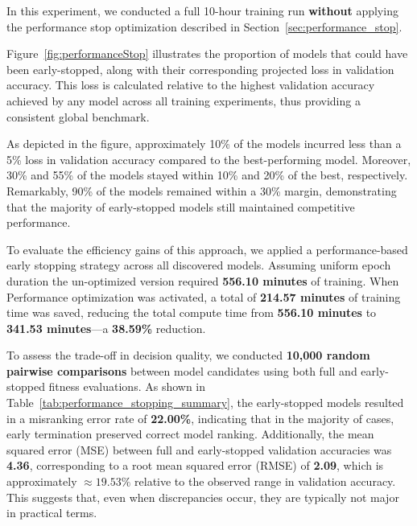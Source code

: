 In this experiment, we conducted a full 10-hour training run \textbf{without} applying the performance stop optimization described in Section~\ref{sec:performance_stop}.

Figure~\ref{fig:performanceStop} illustrates the proportion of models that could have been early-stopped, along with their corresponding projected loss in validation accuracy. This loss is calculated relative to the highest validation accuracy achieved by any model across all training experiments, thus providing a consistent global benchmark.

As depicted in the figure, approximately 10\% of the models incurred less than a 5\% loss in validation accuracy compared to the best-performing model. Moreover, 30\% and 55\% of the models stayed within 10\% and 20\% of the best, respectively. Remarkably, 90\% of the models remained within a 30\% margin, demonstrating that the majority of early-stopped models still maintained competitive performance.

To evaluate the efficiency gains of this approach, we applied a performance-based early stopping strategy across all discovered models. Assuming uniform epoch duration the un-optimized version required \textbf{556.10 minutes} of training. When Performance optimization was activated, a total of \textbf{214.57 minutes} of training time was saved, reducing the total compute time from \textbf{556.10 minutes} to \textbf{341.53 minutes}—a \textbf{38.59\%} reduction.

To assess the trade-off in decision quality, we conducted \textbf{10,000 random pairwise comparisons} between model candidates using both full and early-stopped fitness evaluations. As shown in Table~\ref{tab:performance_stopping_summary}, the early-stopped models resulted in a misranking error rate of \textbf{22.00\%}, indicating that in the majority of cases, early termination preserved correct model ranking. Additionally, the mean squared error (MSE) between full and early-stopped validation accuracies was \textbf{4.36}, corresponding to a root mean squared error (RMSE) of \textbf{2.09}, which is approximately \textbf{$\approx 19.53\%$} relative to the observed range in validation accuracy. This suggests that, even when discrepancies occur, they are typically not major in practical terms.

